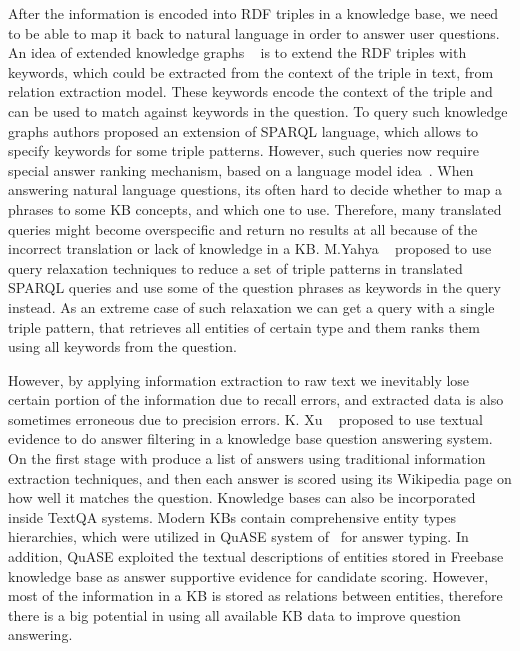 After the information is encoded into RDF triples in a knowledge base, we need to be able to map it back to natural language in order to answer user questions.
An idea of extended knowledge graphs ~\cite{elbassuoni2009language,yahya2013robust} is to extend the RDF triples with keywords, which could be extracted from the context of the triple in text, \eg from relation extraction model.
These keywords encode the context of the triple and can be used to match against keywords in the question.
To query such knowledge graphs authors proposed an extension of SPARQL language, which allows to specify keywords for some triple patterns.
However, such queries now require special answer ranking mechanism, \eg based on a language model idea~\cite{elbassuoni2009language}.
When answering natural language questions, its often hard to decide whether to map a phrases to some KB concepts, and which one to use.
Therefore, many translated queries might become overspecific and return no results at all because of the incorrect translation or lack of knowledge in a KB.
M.Yahya \etal~\cite{yahya2013robust,yahya2016relationship} proposed to use query relaxation techniques to reduce a set of triple patterns in translated SPARQL queries and use some of the question phrases as keywords in the query instead.
As an extreme case of such relaxation we can get a query with a single triple pattern, that retrieves all entities of certain type and them ranks them using all keywords from the question.

However, by applying information extraction to raw text we inevitably lose certain portion of the information due to recall errors, and extracted data is also sometimes erroneous due to precision errors.
K. Xu \etal~\cite{xu2016enhancing} proposed to use textual evidence to do answer filtering in a knowledge base question answering system.
On the first stage with produce a list of answers using traditional information extraction techniques, and then each answer is scored using its Wikipedia page on how well it matches the question. 
Knowledge bases can also be incorporated inside TextQA systems.
Modern KBs contain comprehensive entity types hierarchies, which were utilized in QuASE system of~\cite{Sun:2015:ODQ:2736277.2741651} for answer typing.
In addition, QuASE exploited the textual descriptions of entities stored in Freebase knowledge base as answer supportive evidence for candidate scoring.
However, most of the information in a KB is stored as relations between entities, therefore there is a big potential in using all available KB data to improve question answering.

